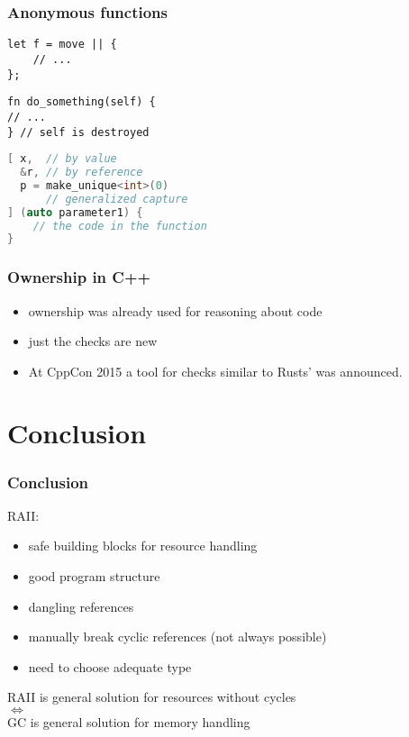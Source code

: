 \documentclass[xcolor=colortbl
]{beamer}
\begin{document}
\begin{frame}
    \frametitle{Anonymous functions}
\begin{lstlisting}[frame=single]
let f = move || {
    // ...
};
\end{lstlisting}

\begin{lstlisting}[frame=single]
fn do_something(self) {
// ...
} // self is destroyed
\end{lstlisting}

\begin{lstlisting}[language=c++, frame=single]
[ x,  // by value
  &r, // by reference
  p = make_unique<int>(0)
      // generalized capture
] (auto parameter1) {
    // the code in the function
}
\end{lstlisting}
\end{frame}

\begin{frame}[label=skippedLambda]
    \frametitle{Ownership in C++}    
    \begin{itemize}
        \item ownership was already used for reasoning about code
        \item just the checks are new
        \item At CppCon 2015 a tool for checks similar to Rusts' was announced.
    \end{itemize}
\end{frame}


\section{Conclusion}


\begin{frame}
    \frametitle{Conclusion}
    RAII:
    \begin{itemize}
        \item safe building blocks for resource handling
        \item good program structure
        \item dangling references
        \item manually break cyclic references (not always possible)
        \item need to choose adequate type
    \end{itemize}
    RAII is general solution for resources without cycles \\ $\iff$ \\GC is general solution for memory handling
\end{frame}
\end{document}
